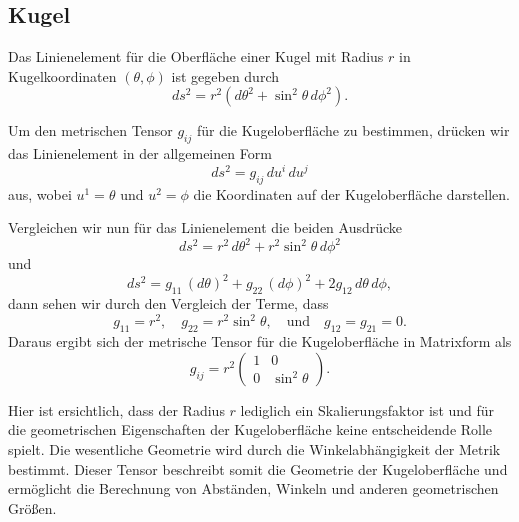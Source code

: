 %
%
%
%
\subsection{Kugel\label{geodaeten:section:MetrischerTensor:Kugel}}

Das Linienelement für die Oberfläche einer Kugel mit Radius $r$ in Kugelkoordinaten $(\theta, \phi)$ ist gegeben durch
\begin{equation}
	ds^2 = r^2 \left( d\theta^2 + \sin^2\theta \, d\phi^2 \right).
\end{equation}

Um den metrischen Tensor $g_{ij}$ für die Kugeloberfläche zu bestimmen, drücken wir das Linienelement in der allgemeinen Form
\begin{equation}
	ds^2 = g_{ij} \, du^i \, du^j
\end{equation}
aus, wobei $u^1 = \theta$ und $u^2 = \phi$ die Koordinaten auf der Kugeloberfläche darstellen.

Vergleichen wir nun für das Linienelement die beiden Ausdrücke 
\begin{equation}
	ds^2 = r^2 \, d\theta^2 + r^2 \sin^2\theta \, d\phi^2
\end{equation}
und
\begin{equation}
	ds^2 = g_{11} \, (d\theta)^2 + g_{22} \, (d\phi)^2 + 2g_{12} \, d\theta \, d\phi,
\end{equation}
dann sehen wir durch den Vergleich der Terme, dass
\begin{equation}
	g_{11} = r^2, \quad g_{22} = r^2 \sin^2\theta, \quad \text{und} \quad g_{12} = g_{21} = 0.
\end{equation}
Daraus ergibt sich der metrische Tensor für die Kugeloberfläche in Matrixform als
\begin{equation}
	g_{ij} = r^2 \begin{pmatrix}
		1 & 0 \\
		0 & \sin^2\theta
	\end{pmatrix}.
\end{equation}

Hier ist ersichtlich, dass der Radius $r$ lediglich ein Skalierungsfaktor ist und für die geometrischen Eigenschaften der Kugeloberfläche keine entscheidende Rolle spielt. 
Die wesentliche Geometrie wird durch die Winkelabhängigkeit der Metrik bestimmt.
Dieser Tensor beschreibt somit die Geometrie der Kugeloberfläche und ermöglicht die Berechnung von Abständen, Winkeln und anderen geometrischen Größen.